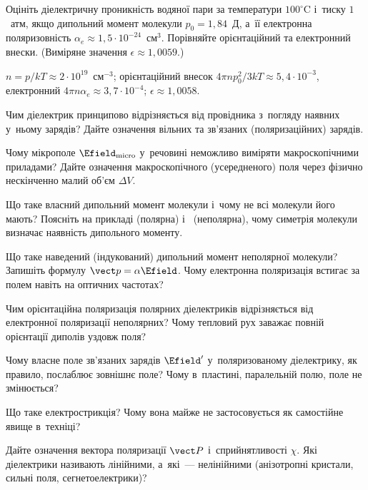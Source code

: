 \begin{problem}\label{prb:WaterVapour}
	Оцініть діелектричну проникність водяної пари за температури $100^\circ$C і~тиску
	$1$~атм, якщо дипольний момент молекули  $p_0 = 1{,}84$~Д, а~її електронна
	поляризовність $\alpha_e \approx 1{,}5\cdot10^{-24}$~см$^3$. Порівняйте орієнтаційний
	та електронний внески. (Виміряне значення $\epsilon \approx 1{,}0059$.)
	\begin{solution}
		$n = p/kT \approx 2\cdot10^{19}$~см$^{-3}$; орієнтаційний внесок $4\pi n p_0^2/3kT \approx 5{,}4\cdot10^{-3}$,
		електронний $4\pi n\alpha_e \approx 3{,}7\cdot10^{-4}$; $\epsilon \approx 1{,}0058$.
	\end{solution}
\end{problem}

\begin{Questions}
	\begin{quizlist}
		\item Чим діелектрик принципово відрізняється від провідника з~погляду наявних у~ньому
		зарядів? Дайте означення вільних та зв'язаних (поляризаційних) зарядів.
		\item Чому мікрополе $\Efield_\text{micro}$ у~речовині неможливо виміряти
		макроскопічними приладами? Дайте означення макроскопічного (усередненого) поля через
		фізично нескінченно малий об'єм $\Delta V$.
		\item Що таке власний дипольний момент молекули і~чому не всі молекули його мають?
		Поясніть на прикладі  (полярна) і~ (неполярна), чому симетрія
		молекули визначає наявність дипольного моменту.
		\item Що таке наведений (індукований) дипольний момент неполярної молекули? Запишіть
		формулу $\vect p = \alpha\Efield$. Чому електронна поляризація встигає за полем навіть
		на оптичних частотах?
		\item Чим орієнтаційна поляризація полярних діелектриків відрізняється від електронної
		поляризації неполярних? Чому тепловий рух заважає повній орієнтації диполів уздовж
		поля?
		\item Чому власне поле зв'язаних зарядів $\Efield'$ у~поляризованому діелектрику, як
		правило, послаблює зовнішнє поле? Чому в~пластині, паралельній полю, поле не
		змінюється?
		\item Що таке електрострикція? Чому вона майже не застосовується як самостійне явище
		в~техніці?
		\item Дайте означення вектора поляризації $\vect P$ і~сприйнятливості $\chi$. Які діелектрики називають лінійними, а~які~--- нелінійними (анізотропні кристали, сильні поля, сегнетоелектрики)?


\end{quizlist}
\end{Questions}
